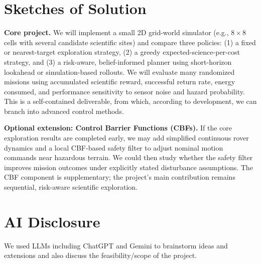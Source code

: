 \documentclass[twoside,11pt]{article}
\begin{document}
\section{Sketches of Solution}
\textbf{Core project.} We will implement a small 2D grid-world simulator (e.g., $8\times 8$ cells with several candidate scientific sites) and compare three policies: (1) a fixed or nearest-target exploration strategy, (2) a greedy expected-science-per-cost strategy, and (3) a risk-aware, belief-informed planner using short-horizon lookahead or simulation-based rollouts. We will evaluate many randomized missions using accumulated scientific reward, successful return rate, energy consumed, and performance sensitivity to sensor noise and hazard probability. This is a self-contained deliverable, from which, according to development, we can branch into advanced control methods.

\textbf{Optional extension: Control Barrier Functions (CBFs).} If the core exploration results are completed early, we may add simplified continuous rover dynamics and a local CBF-based safety filter to adjust nominal motion commands near hazardous terrain. We could then study whether the safety filter improves mission outcomes under explicitly stated disturbance assumptions. The CBF component is supplementary; the project's main contribution remains sequential, risk-aware scientific exploration.


\section{AI Disclosure}
We used LLMs including ChatGPT and Gemini to brainstorm ideas and extensions and also discuss the feasibility/scope of the project.



\end{document}
